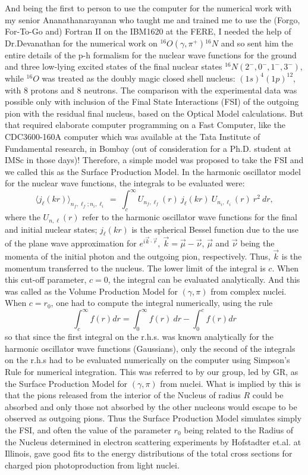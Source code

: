 And being the first to person to use the computer for the numerical work with my senior Ananathanarayanan who taught me and trained me to use the (Forgo, For-To-Go and) Fortran II on the IBM1620 at the FERE, I needed the help of Dr.Devanathan for the numerical work on ${}^{16}O(\gamma, \pi^+){}^{16}N$ and so sent him the entire details of the p-h formalism for the nuclear wave functions for the ground and three low-lying excited states of the final nuclear states $^{16}N(2^-,0^-,1^-,3^-)$, while $^{16}O$ was treated as the doubly magic closed shell nucleus: $(1s)^4(1p)^{12}$, with 8 protons and 8 neutrons. The comparison with the experimental data was possible only with inclusion of the Final State Interactions (FSI) of the outgoing pion with the residual final nucleus, based on the Optical Model calculations. But that required elaborate computer programming on a Fast Computer, like the CDC3600-160A computer which was available at the Tata Institute of Fundamental research, in Bombay (out of consideration for a Ph.D. student at IMSc in those days)! Therefore, a simple model was proposed to take the FSI and we called this as the Surface Production Model. In the harmonic oscillator model for the nuclear wave functions, the integrals to be evaluated were:
$$
\langle j_\ell(kr)\rangle_{n_f,\ell_f;n_i,\ell_i}\ =\  \int_c^\infty U_{n_f,\ell_f}(r)
\ j_{\ell}(kr)\ U_{n_i,\ell_i}(r)\ r^2\ dr,
$$
where the $U_{n,\ell}(r)$ refer to the harmonic oscillator wave functions for the final 
and initial nuclear states; $j_\ell(kr)$ is the spherical Bessel function due to the 
use of the plane wave approximation for $e^{i\vec{k}\cdot \vec{r}},\  
\vec{k}=\vec{\mu}-\vec{\nu}$, $\vec{\mu}$ and $\vec{\nu}$ being the momenta of 
the initial photon and the outgoing pion, respectively. Thus, $\vec{k}$ is the 
momentum transferred to the nucleus. The lower limit of the integral is $c$.  
When this cut-off parameter, $c=0$, the integral can be evaluated analytically.
And this was called as the Volume Production Model for $(\gamma,\pi)$ from complex
nuclei. When $c=r_0$, one had to compute the integral numerically, using the rule
$$
\int_c^\infty f(r) dr = \int_0^\infty f(r)\ dr - \int_0^c f(r) dr
$$
so that since the first integral on the r.h.s. was known analytically for the 
harmonic oscillator wave functions (Gaussians), only the second of the integrals
on the r.h.s had to be evaluated numerically on the computer using Simpson's 
Rule for numerical integration. This was referred to by our group, led by GR, 
as the Surface Production Model for $(\gamma,\pi)$ from nuclei. What is implied 
by this is that the pions released from the interior of the Nucleus of radius 
$R$ could be absorbed and only those not absorbed by the other nucleons would 
escape to be observed as outgoing pions. Thus the Surface Production Model simulates 
simply the FSI, and often the value of the parameter $r_0$ being related to the 
Radius of the Nucleus determined in electron scattering experiments by Hofstadter 
et.al. at Illinois, gave good fits to the energy distributions of the total cross 
sections for charged pion photoproduction from light nuclei.

